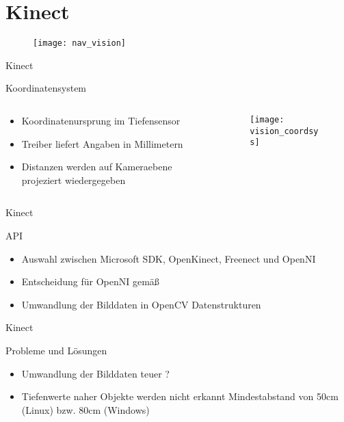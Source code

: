 
\section{Kinect}

\begin{frame}[b]
	\begin{figure}
		\texttt{[image: nav\_vision]}
	\end{figure}
	\vspace*{0.7cm}
\end{frame}

\begin{frame}[t]{Kinect}
	\begin{block}{Koordinatensystem}
		\begin{columns}[t]
			\begin{column}{0.4\textwidth}
				\begin{itemize}
					\item Koordinatenursprung im Tiefensensor
					\item Treiber liefert Angaben in Millimetern
					\item Distanzen werden auf Kameraebene projeziert wiedergegeben
				\end{itemize}
			\end{column}
			\begin{column}{0.4\textwidth}
				\begin{figure}
					\texttt{[image: vision\_coordsys]}
				\end{figure}
			\end{column}
		\end{columns}
	\end{block}
\end{frame}

\begin{frame}[t]{Kinect}
	\begin{block}{API}
		\begin{itemize}
			\item Auswahl zwischen Microsoft SDK, OpenKinect, Freenect und
				OpenNI
			\item Entscheidung für OpenNI gemäß \cite{andersen2012kdsefcva}
			\item Umwandlung der Bilddaten in OpenCV Datenstrukturen
		\end{itemize}
	\end{block}
\end{frame}

\begin{frame}[t]{Kinect}
	\begin{block}{Probleme und Lösungen}
		\begin{itemize}
			\item Umwandlung der Bilddaten teuer \arrow ?
			\item Tiefenwerte naher Objekte werden nicht erkannt \arrow
				Mindestabstand von 50cm (Linux) bzw. 80cm (Windows)
		\end{itemize}
	\end{block}
\end{frame}

